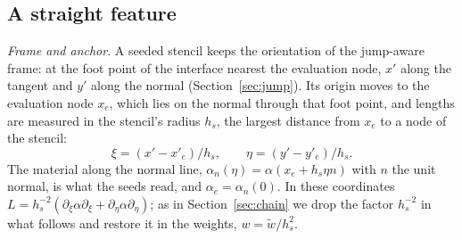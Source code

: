 \documentclass[11pt]{amsart}
\theoremstyle{definition}
\theoremstyle{remark}
\newcommand{\para}[1]{\par\smallskip\noindent\textit{#1}.\enspace}
\begin{document}
\subsection{A straight feature}
\label{sec:straight}
\para{Frame and anchor}
A seeded stencil keeps the orientation of the jump-aware frame: at the foot
point of the interface nearest the evaluation node, $x'$ along the tangent
and $y'$ along the normal (Section~\ref{sec:jump}). Its origin moves to the
evaluation node $x_e$, which lies on the normal through that foot point,
and lengths are measured in the stencil's radius $h_s$, the largest
distance from $x_e$ to a node of the stencil:
\begin{equation}
  \label{eq:frame2d}
  \xi = (x' - x'_e) / h_s, \qquad \eta = (y' - y'_e) / h_s .
\end{equation}
The material along the normal line, $\alpha_n(\eta) = \alpha(x_e + h_s \eta
n)$ with $n$ the unit normal, is what the seeds read, and
$\alpha_e = \alpha_n(0)$. In these coordinates $L = h_s^{-2} (\partial_\xi
\alpha \partial_\xi + \partial_\eta \alpha \partial_\eta)$; as in
Section~\ref{sec:chain} we drop the factor $h_s^{-2}$ in what follows and
restore it in the weights, $w = \tilde w / h_s^2$.
\end{document}
